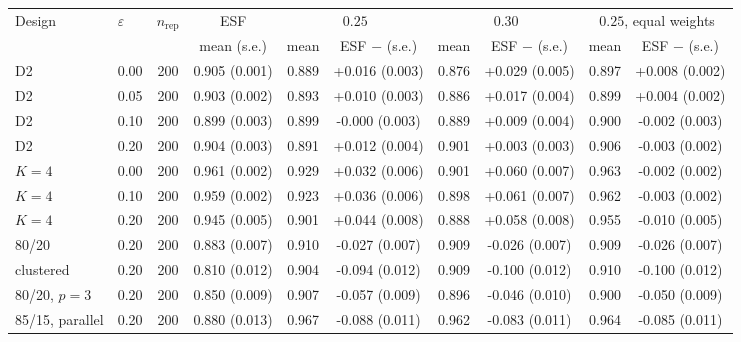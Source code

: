 \begin{tabular}{llcccccccc}
\toprule
Design & $\varepsilon$ & $n_{\mathrm{rep}}$ & ESF & \multicolumn{2}{c}{$0.25$} & \multicolumn{2}{c}{$0.30$} & \multicolumn{2}{c}{$0.25$, equal weights} \\
\cmidrule(lr){5-6}\cmidrule(lr){7-8}\cmidrule(lr){9-10}
 & & & mean (s.e.) & mean & ESF $-$ (s.e.) & mean & ESF $-$ (s.e.) & mean & ESF $-$ (s.e.) \\
\midrule
D2 & 0.00 & 200 & 0.905 (0.001) & 0.889 & +0.016 (0.003) & 0.876 & +0.029 (0.005) & 0.897 & +0.008 (0.002) \\
D2 & 0.05 & 200 & 0.903 (0.002) & 0.893 & +0.010 (0.003) & 0.886 & +0.017 (0.004) & 0.899 & +0.004 (0.002) \\
D2 & 0.10 & 200 & 0.899 (0.003) & 0.899 & -0.000 (0.003) & 0.889 & +0.009 (0.004) & 0.900 & -0.002 (0.003) \\
D2 & 0.20 & 200 & 0.904 (0.003) & 0.891 & +0.012 (0.004) & 0.901 & +0.003 (0.003) & 0.906 & -0.003 (0.002) \\
$K=4$ & 0.00 & 200 & 0.961 (0.002) & 0.929 & +0.032 (0.006) & 0.901 & +0.060 (0.007) & 0.963 & -0.002 (0.002) \\
$K=4$ & 0.10 & 200 & 0.959 (0.002) & 0.923 & +0.036 (0.006) & 0.898 & +0.061 (0.007) & 0.962 & -0.003 (0.002) \\
$K=4$ & 0.20 & 200 & 0.945 (0.005) & 0.901 & +0.044 (0.008) & 0.888 & +0.058 (0.008) & 0.955 & -0.010 (0.005) \\
80/20 & 0.20 & 200 & 0.883 (0.007) & 0.910 & -0.027 (0.007) & 0.909 & -0.026 (0.007) & 0.909 & -0.026 (0.007) \\
clustered & 0.20 & 200 & 0.810 (0.012) & 0.904 & -0.094 (0.012) & 0.909 & -0.100 (0.012) & 0.910 & -0.100 (0.012) \\
80/20, $p=3$ & 0.20 & 200 & 0.850 (0.009) & 0.907 & -0.057 (0.009) & 0.896 & -0.046 (0.010) & 0.900 & -0.050 (0.009) \\
85/15, parallel & 0.20 & 200 & 0.880 (0.013) & 0.967 & -0.088 (0.011) & 0.962 & -0.083 (0.011) & 0.964 & -0.085 (0.011) \\
\bottomrule
\end{tabular}